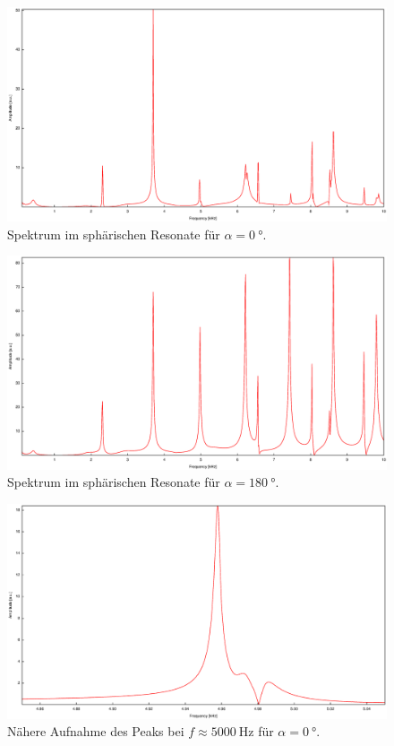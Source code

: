 \begin{figure}
\centering
\includegraphics[width=\linewidth-60pt,height=\textheight-60pt,keepaspectratio]{FP-V23data/2.1_0degree.eps}
\caption{Spektrum im sphärischen Resonate für $\alpha=\SI{0}{\degree}$.}
\label{fig:Overview1}
\end{figure}

\begin{figure}
\centering
\includegraphics[width=\linewidth-60pt,height=\textheight-60pt,keepaspectratio]{FP-V23data/2.1_180degree.eps}
\caption{Spektrum im sphärischen Resonate für $\alpha=\SI{180}{\degree}$.}
\label{fig:Overview2}
\end{figure}

\begin{figure}
\centering
\includegraphics[width=\linewidth-60pt,height=\textheight-60pt,keepaspectratio]{FP-V23data/2.2_0degree.eps}
\caption{Nähere Aufnahme des Peaks bei $f\approx\SI{5000}{\hertz}$ für $\alpha=\SI{0}{\degree}$.}
\label{fig:5k_Peak1}
\end{figure}

